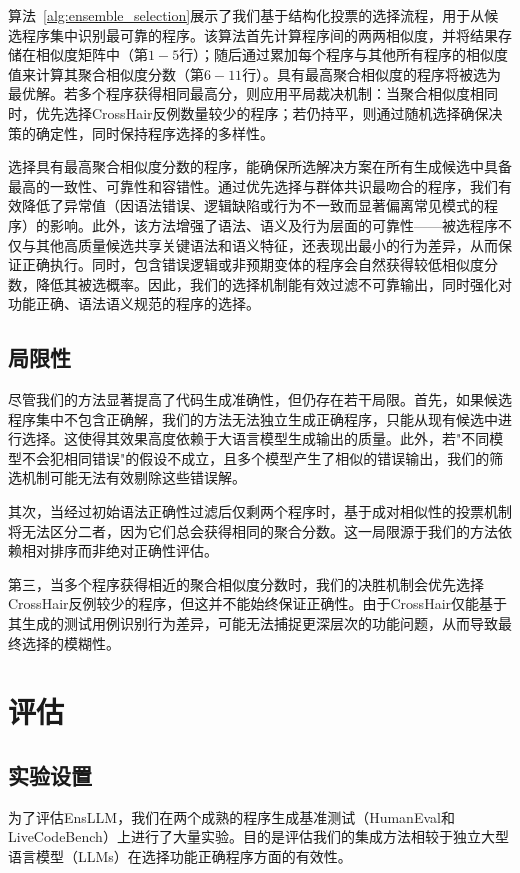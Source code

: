 \documentclass{article}
\newcommand{\tool}{EnsLLM}
\begin{document}
算法~\ref{alg:ensemble_selection}展示了我们基于结构化投票的选择流程，用于从候选程序集中识别最可靠的程序。该算法首先计算程序间的两两相似度，并将结果存储在相似度矩阵中（第$1-5$行）；随后通过累加每个程序与其他所有程序的相似度值来计算其聚合相似度分数（第$6-11$行）。具有最高聚合相似度的程序将被选为最优解。若多个程序获得相同最高分，则应用平局裁决机制：当聚合相似度相同时，优先选择CrossHair反例数量较少的程序；若仍持平，则通过随机选择确保决策的确定性，同时保持程序选择的多样性。

选择具有最高聚合相似度分数的程序，能确保所选解决方案在所有生成候选中具备最高的一致性、可靠性和容错性。通过优先选择与群体共识最吻合的程序，我们有效降低了异常值（因语法错误、逻辑缺陷或行为不一致而显著偏离常见模式的程序）的影响。此外，该方法增强了语法、语义及行为层面的可靠性——被选程序不仅与其他高质量候选共享关键语法和语义特征，还表现出最小的行为差异，从而保证正确执行。同时，包含错误逻辑或非预期变体的程序会自然获得较低相似度分数，降低其被选概率。因此，我们的选择机制能有效过滤不可靠输出，同时强化对功能正确、语法语义规范的程序的选择。
\subsection{局限性}

尽管我们的方法显著提高了代码生成准确性，但仍存在若干局限。首先，如果候选程序集中不包含正确解，我们的方法无法独立生成正确程序，只能从现有候选中进行选择。这使得其效果高度依赖于大语言模型生成输出的质量。此外，若"不同模型不会犯相同错误"的假设不成立，且多个模型产生了相似的错误输出，我们的筛选机制可能无法有效剔除这些错误解。

其次，当经过初始语法正确性过滤后仅剩两个程序时，基于成对相似性的投票机制将无法区分二者，因为它们总会获得相同的聚合分数。这一局限源于我们的方法依赖相对排序而非绝对正确性评估。

第三，当多个程序获得相近的聚合相似度分数时，我们的决胜机制会优先选择CrossHair反例较少的程序，但这并不能始终保证正确性。由于CrossHair仅能基于其生成的测试用例识别行为差异，可能无法捕捉更深层次的功能问题，从而导致最终选择的模糊性。
\section{评估}


\subsection{实验设置}
为了评估\tool，我们在两个成熟的程序生成基准测试（HumanEval和LiveCodeBench）上进行了大量实验。目的是评估我们的集成方法相较于独立大型语言模型（LLMs）在选择功能正确程序方面的有效性。
\end{document}
